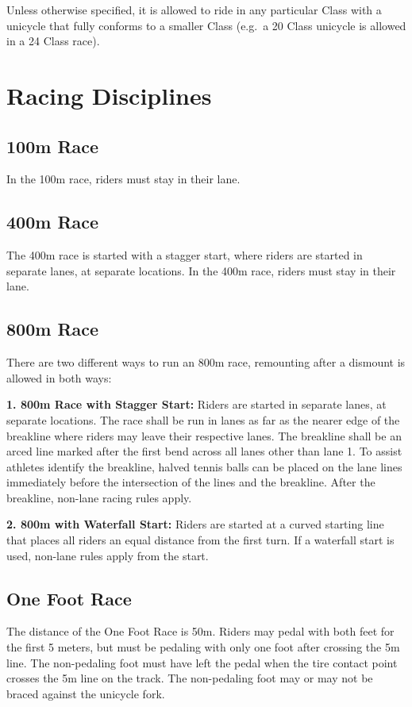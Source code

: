 Unless otherwise specified, it is allowed to ride in any particular Class with a unicycle that fully conforms to a smaller Class
(e.g.\ a 20 Class unicycle is allowed in a 24 Class race).

\section{Racing Disciplines}

\subsection{100m Race}

In the 100m race, riders must stay in their lane.

\subsection{400m Race}

The 400m race is started with a stagger start, where riders are started in separate lanes, at separate locations.
In the 400m race, riders must stay in their lane.

\subsection{800m Race}

There are two different ways to run an 800m race, remounting after a dismount is allowed in both ways:

\textbf{1. 800m Race with Stagger Start:} Riders are started in separate lanes, at separate locations.
The race shall be run in lanes as far as the nearer edge of the breakline where riders may leave their respective lanes.
The breakline shall be an arced line marked after the first bend across all lanes other than lane 1.
To assist athletes identify the breakline, halved tennis balls can be placed on the lane lines immediately before the intersection of the lines and the breakline.
After the breakline, non-lane racing rules apply.

\textbf{2. 800m with Waterfall Start:} Riders are started at a curved starting line that places all riders an equal distance from the first turn.
If a waterfall start is used, non-lane rules apply from the start.

\subsection{One Foot Race}
The distance of the One Foot Race is 50m.
Riders may pedal with both feet for the first 5 meters, but must be pedaling with only one foot after crossing the 5m line.
The non-pedaling foot must have left the pedal when the tire contact point crosses the 5m line on the track.
The non-pedaling foot may or may not be braced against the unicycle fork.

